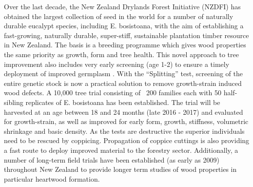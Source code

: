 Over the last decade, the New Zealand Drylands Forest Initiative (NZDFI) has obtained the largest collection of seed in the world for a number of naturally durable eucalypt species, including E. bosistoana, with the aim of establishing a fast-growing, naturally durable, super-stiff, sustainable plantation timber resource in New Zealand. The basis is a breeding programme which gives wood properties the same priority as growth, form and tree health. This novel approach to tree improvement also includes very early screening (age 1-2) to ensure a timely deployment of improved germplasm \citep{altaner_developing2015}. With the “Splitting” test, screening of the entire genetic stock is now a practical solution to remove growth-strain induced wood defects. A 10,000 tree trial consisting of ~200 families each with 50 half-sibling replicates of E. bosistoana has been established. The trial will be harvested at an age between 18 and 24 months (late 2016 - 2017) and evaluated for growth-strain, as well as improved for early form, growth, stiffness, volumetric shrinkage and basic density. As the tests are destructive the superior individuals need to be rescued by coppicing. Propagation of coppice cuttings is also providing a fast route to deploy improved material to the forestry sector. Additionally, a number of long-term field trials have been established (as early as 2009) throughout New Zealand to provide longer term studies of wood properties in particular heartwood formation. 